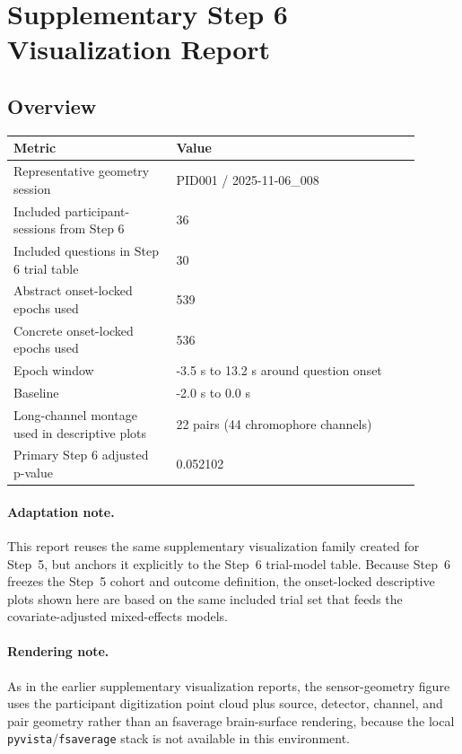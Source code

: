 \documentclass[11pt]{article}
\begin{document}
\section*{Supplementary Step 6 Visualization Report}
\subsection*{Overview}
\begin{tabular}{p{0.36\linewidth}p{0.54\linewidth}}
\toprule
Metric & Value\\
\midrule
Representative geometry session & PID001 / 2025-11-06\_008\\
Included participant-sessions from Step 6 & 36\\
Included questions in Step 6 trial table & 30\\
Abstract onset-locked epochs used & 539\\
Concrete onset-locked epochs used & 536\\
Epoch window & -3.5 s to 13.2 s around question onset\\
Baseline & -2.0 s to 0.0 s\\
Long-channel montage used in descriptive plots & 22 pairs (44 chromophore channels)\\
Primary Step 6 adjusted p-value & 0.052102\\
\bottomrule
\end{tabular}
\paragraph{Adaptation note.} This report reuses the same supplementary visualization family created for Step~5, but anchors it explicitly to the Step~6 trial-model table. Because Step~6 freezes the Step~5 cohort and outcome definition, the onset-locked descriptive plots shown here are based on the same included trial set that feeds the covariate-adjusted mixed-effects models.
\paragraph{Rendering note.} As in the earlier supplementary visualization reports, the sensor-geometry figure uses the participant digitization point cloud plus source, detector, channel, and pair geometry rather than an fsaverage brain-surface rendering, because the local \texttt{pyvista}/\texttt{fsaverage} stack is not available in this environment.
\end{document}
